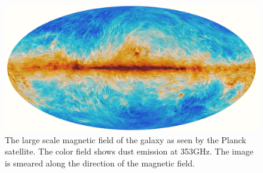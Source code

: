 
\begin{figure} \begin{center}
\includegraphics[width=\textwidth]{figs/2015_353GHz_B-field.png}
\caption[ ]{The large scale magnetic field of the galaxy as seen by the Planck
satellite. The color field shows dust emission at 353GHz.  The image is smeared
along the direction of the magnetic field.  \citep{PlanckXIX15}}
\label{fig.planck} \end{center} \end{figure}
